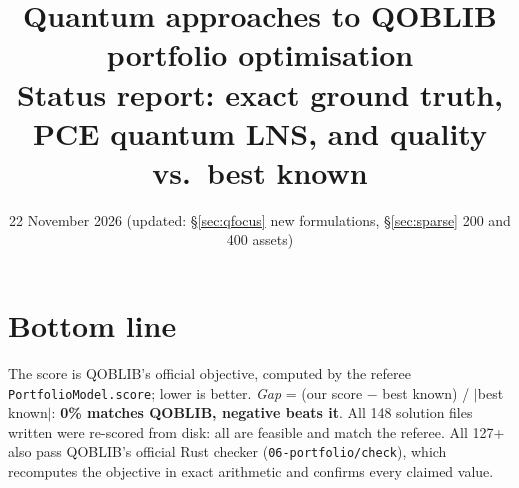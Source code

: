 \documentclass[11pt]{article}
\title{\textbf{Quantum approaches to QOBLIB portfolio optimisation}\\[2pt]
\large Status report: exact ground truth, PCE quantum LNS, and quality vs.\ best known}
\date{22 November 2026 (updated: \S\ref{sec:qfocus} new formulations, \S\ref{sec:sparse} 200 and 400 assets)}
\author{}
\begin{document}
\sloppy
\maketitle
\vspace{-1cm}

\section*{Bottom line}
The score is QOBLIB's official objective, computed by the referee \texttt{PortfolioModel.score}; lower
is better. \emph{Gap} = (our score $-$ best known) / $|$best known$|$: \textbf{0\% matches QOBLIB,
negative beats it}. All 148 solution files written were re-scored from disk: all are feasible and
match the referee. All 127+ also pass QOBLIB's official Rust checker (\texttt{06-portfolio/check}),
which recomputes the objective in exact arithmetic and confirms every claimed value.
\end{document}
